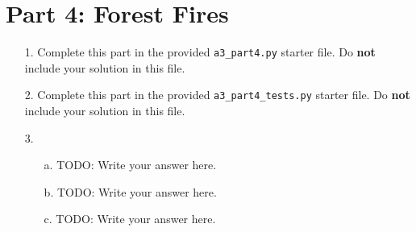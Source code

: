 \documentclass[fontsize=11pt]{article}
\begin{document}
\section*{Part 4: Forest Fires}

\begin{enumerate}
\item[1.]
Complete this part in the provided \texttt{a3\_part4.py} starter file.
Do \textbf{not} include your solution in this file.

\item[2.]
Complete this part in the provided \texttt{a3\_part4\_tests.py} starter file.
Do \textbf{not} include your solution in this file.

\item[3.]

\begin{enumerate}
\item[a.]
TODO: Write your answer here.

\item [b.]
TODO: Write your answer here.

\item[c.]
TODO: Write your answer here.
\end{enumerate}

\end{enumerate}
\end{document}
